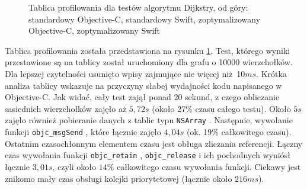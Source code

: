 \documentclass[mgr, shortabstract]{iithesis}
\newcommand{\objcinline}[1]{
    \texttt{#1}
}
\begin{document}
\begin{figure}
    \caption{Tablica profilowania dla testów algorytmu Dijkstry, od góry: standardowy Objective-C, standardowy Swift, zoptymalizowany Objective-C, zoptymalizowany Swift }
    \label{i:dijkstra}
\end{figure}

Tablica profilowania została przedstawiona na rysunku \ref{i:dijkstra}. Test, którego wyniki przestawione są na tablicy został uruchomiony dla grafu o 10000 wierzchołków. Dla lepszej czytelności usunięto wpisy zajmujące nie więcej niż 10$ms$. Krótka analiza tablicy wskazuje na przyczyny słabej wydajności kodu napisanego w Objective-C. Jak widać, cały test zajął ponad 20 sekund, z czego obliczanie sasiednich wierzchołków zajęło aż $5,72s$ (około 27\% czasu całego testu). Około $5s$ zajęło również pobieranie danych z tablic typu \objcinline{NSArray}. Następnie, wywołanie funkcji \objcinline{objc_msgSend}, które łącznie zajęło $4,04s$ (ok. 19\% całkowitego czasu). Ostatnim czasochłonnym elementem czasu jest obługa zliczania referencji. Łączny czas wywołania funkcji \objcinline{objc_retain}, \objcinline{objc_release} i ich pochodnych wyniósł łącznie $3,01s$, czyli około $14\%$ całkowitego czasu wywołania funkcji. Ciekawy jest znikomo mały czas obsługi kolejki priorytetowej (łącznie około $216ms$).
\end{document}
